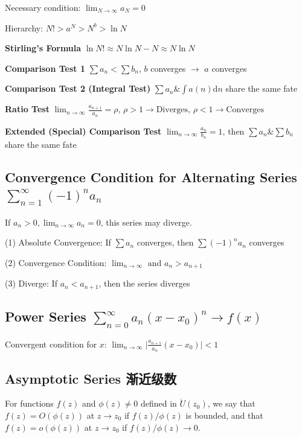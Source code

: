 \documentclass[10pt]{article}
\newcommand{\dd}{\mathrm{d}}
\begin{document}
Necessary condition: $\lim_{N\to \infty} a_N = 0$

Hierarchy: $N! > a^N > N^b > \ln{N}$

\textbf{Stirling's Formula} $\ln{N!} \approx N\ln{N}-N \approx N\ln{N}$

\textbf{Comparison Test 1} $\sum a_n < \sum b_n$, $b$ converges $\to$ $a$ converges

\textbf{Comparison Test 2 (Integral Test)} $\sum a_n \& \int a(n) \dd n$ share the same fate

\textbf{Ratio Test}
	$\lim_{n\to \infty} \frac{a_{n+1}}{a_n} = \rho$, $\rho > 1 \to \text{Diverges}$, $\rho < 1 \to \text{Converges}$

\textbf{Extended (Special) Comparison Test}
$\lim_{n\to \infty} \frac{a_n}{b_n} = 1$, then $\sum a_n \& \sum b_n$ share the same fate

\subsection[Convergence Condition for Alternating Series]{Convergence Condition for Alternating Series $\sum\limits_{n=1}^{\infty} (-1)^n a_n$}

If $a_n>0, \lim_{n\to\infty} a_n = 0$, this series may diverge.

(1) Absolute Convergence: If $\sum a_n$ converges, then $\sum (-1)^n a_n$ converges

(2) Convergence Condition: $\lim_{n\to\infty} \text{ and } a_n > a_{n+1}$

(3) Diverge: If $a_n < a_{n+1}$, then the series diverges

\subsection[Power Series]{Power Series $\sum_{n=0}^\infty a_n (x-x_0)^n \rightarrow f(x)$}

Convergent condition for $x$:
$\lim_{n\to\infty} \big| \frac{a_{n+1}}{a_n} (x-x_0) \big| < 1$

\subsection{Asymptotic Series 渐近级数}

For functions $f(z)$ and $\phi(z)\neq 0$ defined in $\mathring{U}(z_0)$, we say that $f(z) = O(\phi(z))$ at $z\to z_0$ if $f(z)/\phi(z)$ is bounded, and that $f(z) = o(\phi(z))$ at $z\to z_0$ if $f(z)/\phi(z) \to 0$.
\end{document}
